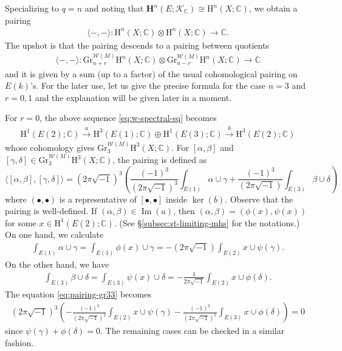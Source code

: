Specializing to \(q=n\) and noting that \(\mathbf{H}^{n}
(E;\mathcal{K}_{\mathbb{C}})\cong\mathrm{H}^{n}(X;\mathbb{C})\), we obtain a pairing 
\begin{eqnarray*}
\langle -,-\rangle \colon \mathrm{H}^{n}(X;\mathbb{C})\otimes
\mathrm{H}^{n}(X;\mathbb{C})\to\mathbb{C}.
\end{eqnarray*}
The upshot is that the pairing descends to 
a pairing between quotients 
\begin{eqnarray*}
\langle-,-\rangle \colon \mathrm{Gr}_{n+r}^{\mathcal{W}(M)}\mathrm{H}^{n}(X;\mathbb{C})
\otimes \mathrm{Gr}_{n-r}^{\mathcal{W}(M)}\mathrm{H}^{n}(X;\mathbb{C})\to\mathbb{C}
\end{eqnarray*}
and it 
is given by a sum (up to a factor) of the usual cohomological pairing on \(E(k)\)'s.
For the later use, let us give the precise formula for the case \(n=3\) and \(r=0,1\)
and the explanation will be given later in a moment.

\begin{situation}
For \(r=0\), the above sequence \eqref{eq:w-spectral-sq} becomes
\begin{eqnarray}
\label{eq:E03}
\mathrm{H}^{1}(E(2);\mathbb{C})\xrightarrow{a} \mathrm{H}^{3}(E(1);\mathbb{C})\oplus\mathrm{H}^{1}(E(3);\mathbb{C})\xrightarrow{b}\mathrm{H}^{3}(E(2);\mathbb{C})
\end{eqnarray}
whose cohomology gives \(\mathrm{Gr}_{3}^{\mathcal{W}(M)}\mathrm{H}^{3}(X;\mathbb{C})\).
For \([\alpha,\beta]\) and \([\gamma,\delta]\in
\mathrm{Gr}_{3}^{\mathcal{W}(M)}\mathrm{H}^{3}(X;\mathbb{C})\), 
the pairing is defined as
\begin{equation}
\label{eq:pairing-gr33}
\langle [\alpha,\beta],[\gamma,\delta]\rangle 
= (2\pi\sqrt{-1})^{3}\left(\frac{(-1)^{3}}{(2\pi\sqrt{-1})^{3}}\int_{E(1)} \alpha\cup\gamma
+\frac{(-1)^{3}}{(2\pi\sqrt{-1})}
\int_{E(3)} \beta\cup\delta\right)
\end{equation}
where \((\bullet,\bullet)\) is a representative of 
\([\bullet,\bullet]\) inside \(\operatorname{ker}(b)\).
Observe that the pairing is well-defined. If 
\((\alpha,\beta)\in\operatorname{Im}(a)\), then 
\((\alpha,\beta)=(\phi(x),\psi(x))\)
for some \(x\in\mathrm{H}^{1}(E(2);\mathbb{C})\).
(See \S\ref{subsec:st-limiting-mhs} for the notations.) 
On one hand, we calculate
\begin{eqnarray*}
\int_{E(1)} \alpha\cup\gamma=
\int_{E(1)} \phi(x)\cup\gamma=
-(2\pi\sqrt{-1})\int_{E(2)} x\cup\psi(\gamma).
\end{eqnarray*}
On the other hand, we have
\begin{eqnarray*}
\int_{E(3)} \beta\cup\delta=
\int_{E(3)} \psi(x)\cup\delta=
-\frac{1}{2\pi\sqrt{-1}}
\int_{E(2)}x\cup \phi(\delta).
\end{eqnarray*}
The equation \eqref{eq:pairing-gr33} becomes
\begin{eqnarray*}
(2\pi\sqrt{-1})^{3}\left(-\frac{(-1)^{3}}{(2\pi\sqrt{-1})^{2}}\int_{E(2)} 
x\cup\psi(\gamma)
-\frac{(-1)^{3}}{(2\pi\sqrt{-1})^{2}}
\int_{E(3)} x\cup\phi(\delta)\right)=0
\end{eqnarray*}
since \(\psi(\gamma)+\phi(\delta)=0\).
The remaining cases can be checked in a similar fashion.
\end{situation}

